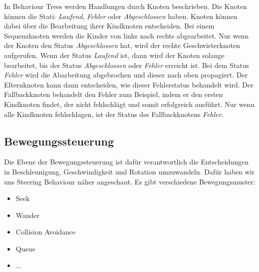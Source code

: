 In Behaviour Trees werden Handlungen durch Knoten beschrieben. Die Knoten können die Stati: \textit{Laufend}, \textit{Fehler} oder \textit{Abgeschlossen} haben.
Knoten können dabei über die Bearbeitung ihrer Kindknoten entscheiden. Bei einem Sequenzknoten werden die Kinder von links nach rechts abgearbeitet. Nur wenn der Knoten den Status \textit{Abgeschlossen} hat, wird der rechte Geschwisterknoten aufgerufen. Wenn der Status \textit{Laufend} ist, dann wird der Knoten solange bearbeitet, bis der Status \textit{Abgeschlossen} oder \textit{Fehler} erreicht ist. Bei dem Status \textit{Fehler} wird die Abarbeitung abgebrochen und dieser nach oben propagiert. Der Elternknoten kann dann entscheiden, wie dieser Fehlerstatus behandelt wird.
Der Fallbackknoten behandelt den Fehler zum Beispiel, indem er den ersten Kindknoten findet, der nicht fehlschlägt und somit erfolgreich ausführt. Nur wenn alle Kindknoten fehlschlagen, ist der Status des Fallbackknotens \textit{Fehler}.

\subsection{Bewegungssteuerung}

Die Ebene der Bewegungssteuerung ist dafür verantwortlich die Entscheidungen in Beschleunigung, Geschwindigkeit und Rotation umzuwandeln. Dafür haben wir uns Steering Behaviour \cite{SteeringBehaviour} näher angeschaut. Es gibt verschiedene Bewegungsmuster:

\begin{itemize}
\item Seek
\item Wander
\item Collision Avoidance
\item Queue
\item ...
\end{itemize}

